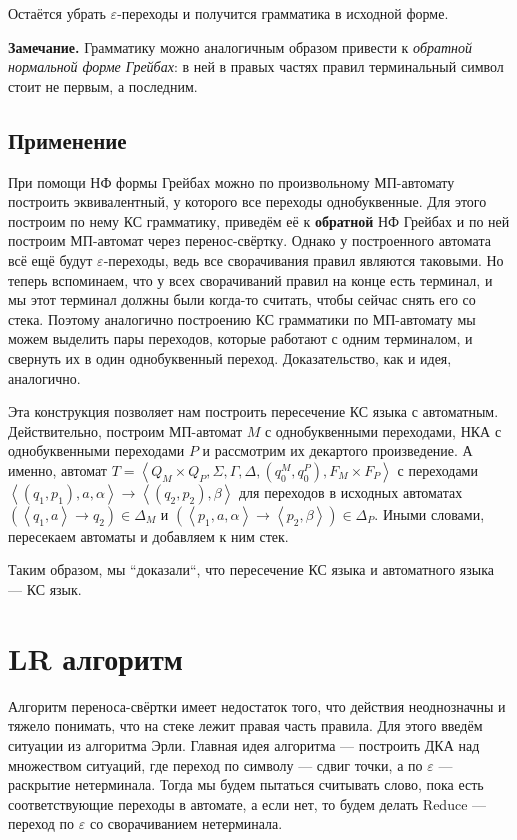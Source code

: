 \QED

Остаётся убрать $\varepsilon$-переходы и получится грамматика в исходной форме.

\textbf{Замечание.} Грамматику можно аналогичным образом привести к \textit{обратной нормальной форме Грейбах}: в ней в правых частях правил терминальный символ стоит не первым, а последним.

\subsection{Применение}
При помощи НФ формы Грейбах можно по произвольному МП-автомату построить эквивалентный, у которого все переходы однобуквенные.
Для этого построим по нему КС грамматику, приведём её к \textbf{обратной} НФ Грейбах и по ней построим МП-автомат через перенос-свёртку.
Однако у построенного автомата всё ещё будут $\varepsilon$-переходы, ведь все сворачивания правил являются таковыми.
Но теперь вспоминаем, что у всех сворачиваний правил на конце есть терминал, и мы этот терминал должны были когда-то считать, чтобы сейчас снять его со стека.
Поэтому аналогично построению КС грамматики по МП-автомату мы можем выделить пары переходов, которые работают с одним терминалом, и свернуть их в один однобуквенный переход.
Доказательство, как и идея, аналогично.

Эта конструкция позволяет нам построить пересечение КС языка с автоматным.
Действительно, построим МП-автомат $M$ с однобуквенными переходами, НКА с однобуквенными переходами $P$ и рассмотрим их декартого произведение.
А именно, автомат $T = \left<Q_M \times Q_P, \Sigma, \Gamma, \Delta, (q_0^M, q_0^P), F_M \times F_P \right>$ с переходами $\left<(q_1, p_1), a, \alpha \right> \to \left<(q_2, p_2), \beta \right>$ для переходов в исходных автоматах $(\left<q_1, a \right> \to q_2) \in \Delta_M$ и $(\left<p_1, a, \alpha \right> \to \left<p_2, \beta \right>) \in \Delta_P$.
Иными словами, пересекаем автоматы и добавляем к ним стек.

Таким образом, мы ``доказали``, что пересечение КС языка и автоматного языка --- КС язык.

\section{LR алгоритм}
Алгоритм переноса-свёртки имеет недостаток того, что действия неоднозначны и тяжело понимать, что на стеке лежит правая часть правила.
Для этого введём ситуации из алгоритма Эрли. Главная идея алгоритма --- построить ДКА над множеством ситуаций, где переход по символу --- сдвиг точки, а по $\varepsilon$ --- раскрытие нетерминала.
Тогда мы будем пытаться считывать слово, пока есть соответствующие переходы в автомате, а если нет, то будем делать Reduce --- переход по $\varepsilon$ со сворачиванием нетерминала.

